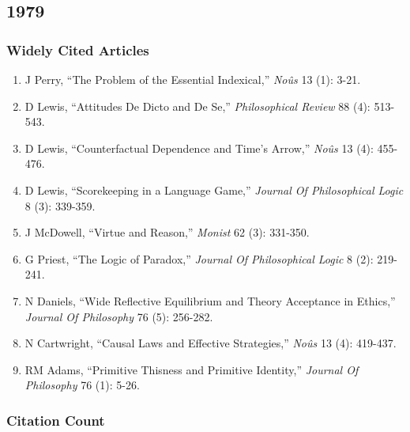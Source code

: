 \documentclass[
  10pt,
  letterpaper,
  DIV=11,
  numbers=noendperiod,
  twoside]{scrartcl}
\providecommand{\tightlist}{%
  \setlength{\itemsep}{0pt}\setlength{\parskip}{0pt}}\usepackage{longtable,booktabs,array}
\begin{document}
\newpage

\subsection{1979}\label{sec-s1979}

\subsubsection*{Widely Cited Articles}\label{widely-cited-articles-3}

\begin{enumerate}
\def\labelenumi{\arabic{enumi}.}
\tightlist
\item
  J Perry, ``The Problem of the Essential Indexical,'' \emph{Noûs} 13
  (1): 3-21.
\item
  D Lewis, ``Attitudes De Dicto and De Se,'' \emph{Philosophical Review}
  88 (4): 513-543.
\item
  D Lewis, ``Counterfactual Dependence and Time's Arrow,'' \emph{Noûs}
  13 (4): 455-476.
\item
  D Lewis, ``Scorekeeping in a Language Game,'' \emph{Journal Of
  Philosophical Logic} 8 (3): 339-359.
\item
  J McDowell, ``Virtue and Reason,'' \emph{Monist} 62 (3): 331-350.
\item
  G Priest, ``The Logic of Paradox,'' \emph{Journal Of Philosophical
  Logic} 8 (2): 219-241.
\item
  N Daniels, ``Wide Reflective Equilibrium and Theory Acceptance in
  Ethics,'' \emph{Journal Of Philosophy} 76 (5): 256-282.
\item
  N Cartwright, ``Causal Laws and Effective Strategies,'' \emph{Noûs} 13
  (4): 419-437.
\item
  RM Adams, ``Primitive Thisness and Primitive Identity,'' \emph{Journal
  Of Philosophy} 76 (1): 5-26.
\end{enumerate}

\subsubsection*{Citation Count}\label{sec-count-1979}
\end{document}

